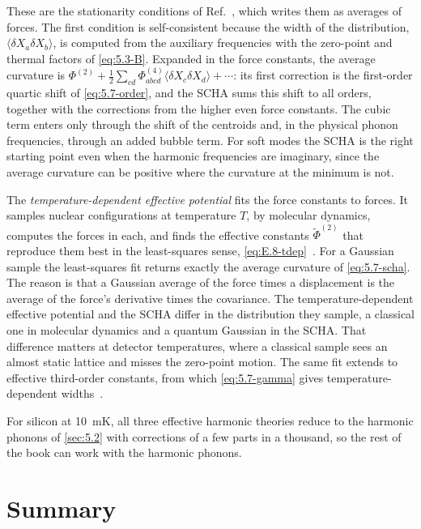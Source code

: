 These are the stationarity conditions of Ref.~\cite[Eqs.~(21) and~(22)]{errea2014anharmonic}, which writes them as averages of forces. The first condition is self-consistent because the width of the distribution, $\langle\delta X_a\delta X_b\rangle$, is computed from the auxiliary frequencies with the zero-point and thermal factors of \cref{eq:5.3-B}. Expanded in the force constants, the average curvature is $\Phi^{(2)} + \tfrac12\sum_{cd}\Phi^{(4)}_{abcd}\langle\delta X_c\delta X_d\rangle + \cdots$: its first correction is the first-order quartic shift of \cref{eq:5.7-order}, and the SCHA sums this shift to all orders, together with the corrections from the higher even force constants. The cubic term enters only through the shift of the centroids and, in the physical phonon frequencies, through an added bubble term. For soft modes the SCHA is the right starting point even when the harmonic frequencies are imaginary, since the average curvature can be positive where the curvature at the minimum is not.

The \emph{temperature-dependent effective potential} fits the force constants to forces. It samples nuclear configurations at temperature $T$, by molecular dynamics, computes the forces in each, and finds the effective constants $\tilde\Phi^{(2)}$ that reproduce them best in the least-squares sense, \cref{eq:E.8-tdep}~\cite{hellman2011lattice}. For a Gaussian sample the least-squares fit returns exactly the average curvature of \cref{eq:5.7-scha}. The reason is that a Gaussian average of the force times a displacement is the average of the force's derivative times the covariance. The temperature-dependent effective potential and the SCHA differ in the distribution they sample, a classical one in molecular dynamics and a quantum Gaussian in the SCHA. That difference matters at detector temperatures, where a classical sample sees an almost static lattice and misses the zero-point motion. The same fit extends to effective third-order constants, from which \cref{eq:5.7-gamma} gives temperature-dependent widths~\cite{hellman2013temperature}.

For silicon at \SI{10}{mK}, all three effective harmonic theories reduce to the harmonic phonons of \cref{sec:5.2} with corrections of a few parts in a thousand, so the rest of the book can work with the harmonic phonons.

\section*{Summary}

